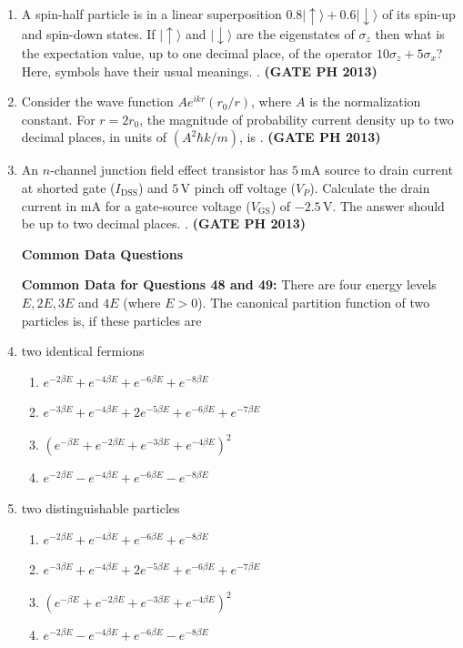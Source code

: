 \documentclass[14pt, a4paper]{extarticle}
\begin{document}
\begin{enumerate}[label=\textbf{Q. \arabic*}]
\item A spin-half particle is in a linear superposition $0.8|\uparrow\rangle + 0.6|\downarrow\rangle$ of its spin-up and spin-down states. If $|\uparrow\rangle$ and $|\downarrow\rangle$ are the eigenstates of $\sigma_z$ then what is the expectation value, up to one decimal place, of the operator $10\sigma_z + 5\sigma_x$? Here, symbols have their usual meanings. \underline{\hspace{5em}}.
\hfill \textbf{(GATE PH 2013)}

\item Consider the wave function $A e^{ikr} (r_0/r)$, where $A$ is the normalization constant. For $r = 2r_0$, the magnitude of probability current density up to two decimal places, in units of $(A^2\hbar k/m)$, is \underline{\hspace{5em}}.
\hfill \textbf{(GATE PH 2013)}

\item An $n$-channel junction field effect transistor has $5\,\text{mA}$ source to drain current at shorted gate ($I_{\text{DSS}}$) and $5\,\text{V}$ pinch off voltage ($V_P$). Calculate the drain current in $\text{mA}$ for a gate-source voltage ($V_{\text{GS}}$) of $-2.5\,\text{V}$. The answer should be up to two decimal places. \underline{\hspace{5em}}.
\hfill \textbf{(GATE PH 2013)}

\textbf{Common Data Questions}

\textbf{Common Data for Questions 48 and 49:} There are four energy levels $E, 2E, 3E$ and $4E$ (where $E>0$). The canonical partition function of two particles is, if these particles are

\item two identical fermions
\begin{enumerate}
\item $e^{-2\beta E} + e^{-4\beta E} + e^{-6\beta E} + e^{-8\beta E}$
\item $e^{-3\beta E} + e^{-4\beta E} + 2e^{-5\beta E} + e^{-6\beta E} + e^{-7\beta E}$
\item $(e^{-\beta E} + e^{-2\beta E} + e^{-3\beta E} + e^{-4\beta E})^2$
\item $e^{-2\beta E} - e^{-4\beta E} + e^{-6\beta E} - e^{-8\beta E}$
\end{enumerate}

\item two distinguishable particles
\begin{enumerate}
\item $e^{-2\beta E} + e^{-4\beta E} + e^{-6\beta E} + e^{-8\beta E}$
\item $e^{-3\beta E} + e^{-4\beta E} + 2e^{-5\beta E} + e^{-6\beta E} + e^{-7\beta E}$
\item $(e^{-\beta E} + e^{-2\beta E} + e^{-3\beta E} + e^{-4\beta E})^2$
\item $e^{-2\beta E} - e^{-4\beta E} + e^{-6\beta E} - e^{-8\beta E}$
\end{enumerate}


\end{enumerate}
\end{document}
